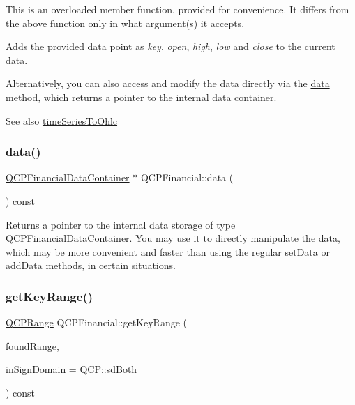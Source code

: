 This is an overloaded member function, provided for convenience. It differs from the above function only in what argument(s) it accepts.

Adds the provided data point as {\itshape key}, {\itshape open}, {\itshape high}, {\itshape low} and {\itshape close} to the current data.

Alternatively, you can also access and modify the data directly via the \hyperlink{class_q_c_p_financial_aec3f666271cf48bd7b87d84fe3f8c074}{data} method, which returns a pointer to the internal data container.

\begin{DoxySeeAlso}{See also}
\hyperlink{class_q_c_p_financial_a9a058c035040d3939b8884f4aaccb1a7}{time\+Series\+To\+Ohlc} 
\end{DoxySeeAlso}
\mbox{\label{class_q_c_p_financial_aec3f666271cf48bd7b87d84fe3f8c074}} 
\subsubsection{\texorpdfstring{data()}{data()}}
{\footnotesize\ttfamily \hyperlink{class_q_c_p_data_container}{Q\+C\+P\+Financial\+Data\+Container} $\ast$ Q\+C\+P\+Financial\+::data (\begin{DoxyParamCaption}{ }\end{DoxyParamCaption}) const\hspace{0.3cm}{\ttfamily [inline]}}

Returns a pointer to the internal data storage of type Q\+C\+P\+Financial\+Data\+Container. You may use it to directly manipulate the data, which may be more convenient and faster than using the regular \hyperlink{class_q_c_p_financial_a72089e75b8a50d18097526c3c79fdb85}{set\+Data} or \hyperlink{class_q_c_p_financial_a372ac031e44a7a6c912d203556af96f7}{add\+Data} methods, in certain situations. \mbox{\label{class_q_c_p_financial_a15d68fb257113fef697356d65fa76559}} 
\subsubsection{\texorpdfstring{get\+Key\+Range()}{getKeyRange()}}
{\footnotesize\ttfamily \hyperlink{class_q_c_p_range}{Q\+C\+P\+Range} Q\+C\+P\+Financial\+::get\+Key\+Range (\begin{DoxyParamCaption}\item[{bool \&}]{found\+Range,  }\item[{\hyperlink{namespace_q_c_p_afd50e7cf431af385614987d8553ff8a9}{Q\+C\+P\+::\+Sign\+Domain}}]{in\+Sign\+Domain = {\ttfamily \hyperlink{namespace_q_c_p_afd50e7cf431af385614987d8553ff8a9aa38352ef02d51ddfa4399d9551566e24}{Q\+C\+P\+::sd\+Both}} }\end{DoxyParamCaption}) const\hspace{0.3cm}{\ttfamily [virtual]}}

